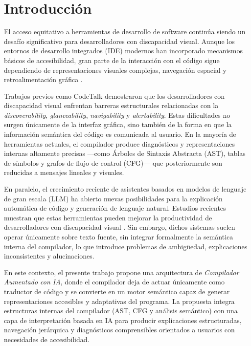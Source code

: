 \documentclass[conference]{IEEEtran}
\begin{document}
\section{Introducción}

El acceso equitativo a herramientas de desarrollo de software continúa siendo un desafío significativo para desarrolladores con discapacidad visual. Aunque los entornos de desarrollo integrados (IDE) modernos han incorporado mecanismos básicos de accesibilidad, gran parte de la interacción con el código sigue dependiendo de representaciones visuales complejas, navegación espacial y retroalimentación gráfica \cite{codetalk}.

Trabajos previos como CodeTalk \cite{codetalk} demostraron que los desarrolladores con discapacidad visual enfrentan barreras estructurales relacionadas con la \textit{discoverability}, \textit{glanceability}, \textit{navigability} y \textit{alertability}. Estas dificultades no surgen únicamente de la interfaz gráfica, sino también de la forma en que la información semántica del código es comunicada al usuario. En la mayoría de herramientas actuales, el compilador produce diagnósticos y representaciones internas altamente precisas —como Árboles de Sintaxis Abstracta (AST), tablas de símbolos y grafos de flujo de control (CFG)— que posteriormente son reducidas a mensajes lineales y visuales.

En paralelo, el crecimiento reciente de asistentes basados en modelos de lenguaje de gran escala (LLM) ha abierto nuevas posibilidades para la explicación automática de código y generación de lenguaje natural. Estudios recientes muestran que estas herramientas pueden mejorar la productividad de desarrolladores con discapacidad visual \cite{genai_accessibility}. Sin embargo, dichos sistemas suelen operar únicamente sobre texto fuente, sin integrar formalmente la semántica interna del compilador, lo que introduce problemas de ambigüedad, explicaciones inconsistentes y alucinaciones.

En este contexto, el presente trabajo propone una arquitectura de \textit{Compilador Aumentado con IA}, donde el compilador deja de actuar únicamente como traductor de código y se convierte en un motor semántico capaz de generar representaciones accesibles y adaptativas del programa. La propuesta integra estructuras internas del compilador (AST, CFG y análisis semántico) con una capa de interpretación basada en IA para producir explicaciones estructuradas, navegación jerárquica y diagnósticos comprensibles orientados a usuarios con necesidades de accesibilidad.
\end{document}
